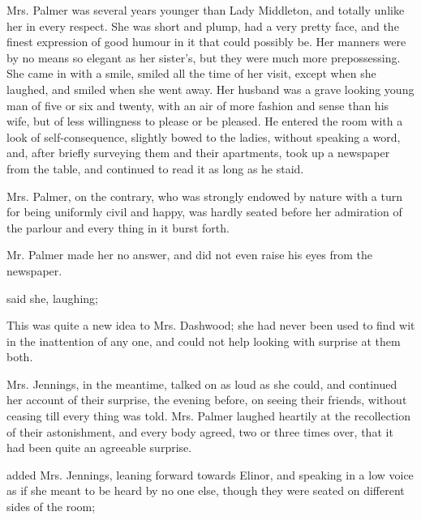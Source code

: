 Mrs. Palmer was several years younger than Lady Middleton, and totally unlike her in every respect. She was short and plump, had a very pretty face, and the finest expression of good humour in it that could possibly be. Her manners were by no means so elegant as her sister's, but they were much more prepossessing. She came in with a smile, smiled all the time of her visit, except when she laughed, and smiled when she went away. Her husband was a grave looking young man of five or six and twenty, with an air of more fashion and sense than his wife, but of less willingness to please or be pleased. He entered the room with a look of self-consequence, slightly bowed to the ladies, without speaking a word, and, after briefly surveying them and their apartments, took up a newspaper from the table, and continued to read it as long as he staid.

Mrs. Palmer, on the contrary, who was strongly endowed by nature with a turn for being uniformly civil and happy, was hardly seated before her admiration of the parlour and every thing in it burst forth.


Mr. Palmer made her no answer, and did not even raise his eyes from the newspaper.

 said she, laughing; 

This was quite a new idea to Mrs. Dashwood; she had never been used to find wit in the inattention of any one, and could not help looking with surprise at them both.

Mrs. Jennings, in the meantime, talked on as loud as she could, and continued her account of their surprise, the evening before, on seeing their friends, without ceasing till every thing was told. Mrs. Palmer laughed heartily at the recollection of their astonishment, and every body agreed, two or three times over, that it had been quite an agreeable surprise.

 added Mrs. Jennings, leaning forward towards Elinor, and speaking in a low voice as if she meant to be heard by no one else, though they were seated on different sides of the room; 

